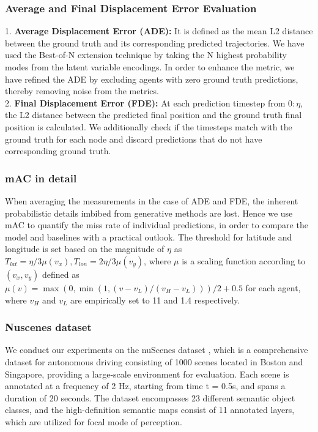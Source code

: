 \documentclass{article}
\begin{document}
\subsubsection{Average and Final Displacement Error
Evaluation}
1.\textbf{ Average Displacement Error (ADE):} It is defined as the mean L2 distance between the ground truth and its corresponding predicted trajectories. We have used the Best-of-N extension technique \cite{chen2022scept} by taking the N highest probability modes from the latent variable encodings. In order to enhance the metric, we have refined the ADE by excluding agents with zero ground truth predictions, thereby removing noise from the metrics.  \\
2.\textbf{ Final Displacement Error (FDE): } At each prediction timestep from $0:\eta$, the L2 distance between the predicted final position and the ground truth final position is calculated. We additionally check if the timesteps match with the ground truth for each node and discard predictions that do not have corresponding ground truth.
\subsubsection{mAC in detail}
When averaging the measurements in the case of ADE and FDE, the inherent probabilistic details imbibed from generative methods are lost. Hence we use mAC to quantify the miss rate of individual predictions, in order to compare the model and baselines with a practical outlook. 
The threshold for latitude and longitude is set based on the magnitude of $\eta$ as $T_{l a t}=\eta / 3 \mu\left(v_x\right), T_{l o n}=2 \eta/ 3 \mu\left(v_y\right)$, where $\mu$ is a scaling function according to $\left(v_x, v_y\right)$ defined as $\mu(v)=\max \left(0, \min \left(1,\left(v-v_L\right) /\left(v_H-v_L\right)\right)\right) / 2+0.5$ for each agent, where $v_H$ and $v_L$ are empirically set to 11 and 1.4 respectively. 
\subsubsection{Nuscenes dataset}
We conduct our experiments on the nuScenes dataset \cite{caesar2020nuscenes}, which is a comprehensive dataset for autonomous driving consisting of 1000 scenes located in Boston and Singapore, providing a large-scale environment for evaluation. Each scene is annotated at a frequency of 2 Hz, starting from time t = 0.5s, and spans a duration of 20 seconds. The dataset encompasses 23 different semantic object classes, and the high-definition semantic maps consist of 11 annotated layers, which are utilized for focal mode of perception.
\end{document}
